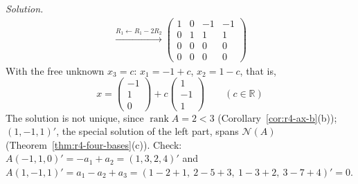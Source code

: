 \documentclass[12pt]{article}
\newcommand{\R}{\mathbb R}
\DeclareMathOperator{\rank}{rank}
\theoremstyle{definition}
\newenvironment{solution}{\par\noindent\textit{Solution.}\ }{\par\smallskip}
\begin{document}
\begin{solution}
\[\begin{gathered}
\xrightarrow{R_1\leftarrow R_1-2R_2}
\left(\begin{array}{ccc|c}1&0&-1&-1\\0&1&1&1\\0&0&0&0\\0&0&0&0\end{array}\right)
\end{gathered}
\]
With the free unknown \(x_3=c\): \(x_1=-1+c\), \(x_2=1-c\), that is,
\[
x=\begin{pmatrix}-1\\1\\0\end{pmatrix}+c\begin{pmatrix}1\\-1\\1\end{pmatrix}\qquad(c\in\R)
\]
The solution is not unique, since \(\rank A=2<3\) (Corollary~\ref{cor:r4-ax-b}(b)); \((1,-1,1)'\), the special
solution of the left part, spans \(\mathcal N(A)\) (Theorem~\ref{thm:r4-four-bases}(c)). Check: \(A(-1,1,0)'=-a_1+a_2=(1,3,2,4)'\) and \(A(1,-1,1)'=a_1-a_2+a_3=(1-2+1,\ 2-5+3,\ 1-3+2,\ 3-7+4)'=0\).
\end{solution}
\end{document}
